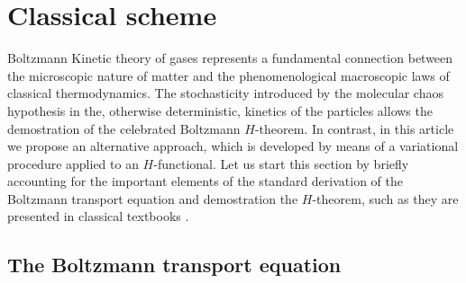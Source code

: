 

\section{Classical scheme}\label{sec:classical}

Boltzmann Kinetic theory of gases represents a fundamental connection
between the microscopic nature of matter and the phenomenological macroscopic  laws of classical thermodynamics.
The stochasticity introduced by the molecular chaos hypothesis in the, otherwise deterministic, kinetics of the
particles allows the demostration 
of the celebrated Boltzmann $H$-theorem. In contrast, in this article we propose an alternative approach, which is 
developed by means of a variational procedure applied to an $H$-functional.
Let us start this section by briefly accounting for the important elements of the 
standard derivation of the Boltzmann transport equation and demostration the $H$-theorem,
such as they are presented in classical textbooks \cite{bib:huang}. 

\subsection{The Boltzmann transport equation}

